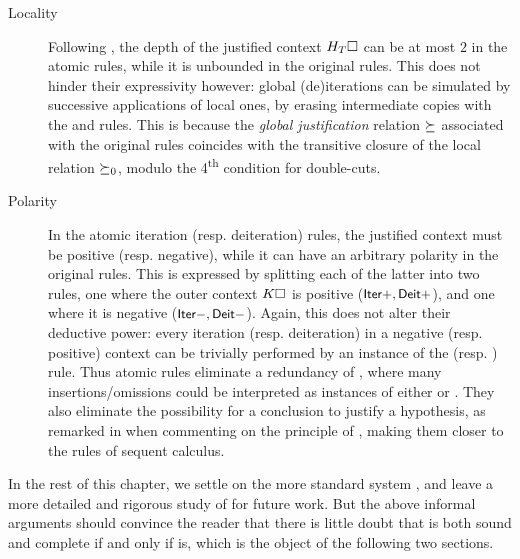 \begin{description}
  \item[Locality] Following , the depth of the
  justified context $H_T\square$ can be at most $2$ in the atomic rules, while it
  is unbounded in the original rules. This does not hinder their expressivity
  however: global (de)iterations can be simulated by successive applications of
  local ones, by erasing intermediate copies with the  and 
  rules. This is because the \emph{global justification} relation $\mathbin{\succeq}$
  associated with the original rules coincides with the transitive closure of
  the local relation $\mathbin{\succeq_0}$, modulo the 4\textsuperscript{th} condition for
  double-cuts.
  \item[Polarity] In the atomic iteration (resp. deiteration) rules, the
  justified context must be positive (resp. negative), while it can have an
  arbitrary polarity in the original rules. This is expressed by splitting each
  of the latter into two rules, one where the outer context $K\square$ is positive
  ($\text{\small$\mathsf{Iter{+}}$},\text{\small$\mathsf{Deit{+}}$}$), and one where it is negative
  ($\text{\small$\mathsf{Iter{-}}$},\text{\small$\mathsf{Deit{-}}$}$). Again, this does not alter their deductive
  power: every iteration (resp. deiteration) in a negative (resp. positive)
  context can be trivially performed by an instance of the  (resp.
  ) rule. Thus atomic rules eliminate a redundancy of ,
  where many insertions/omissions could be interpreted as instances of either
   or . They also eliminate the possibility for a
  conclusion to justify a hypothesis, as remarked in  when
  commenting on the principle of , making them closer to the
  rules of sequent calculus.
\end{description}

In the rest of this chapter, we settle on the more standard system ,
and leave a more detailed and rigorous study of  for future work.
But the above informal arguments should convince the reader that there is little
doubt that  is both sound and complete if and only if 
is, which is the object of the following two sections.

